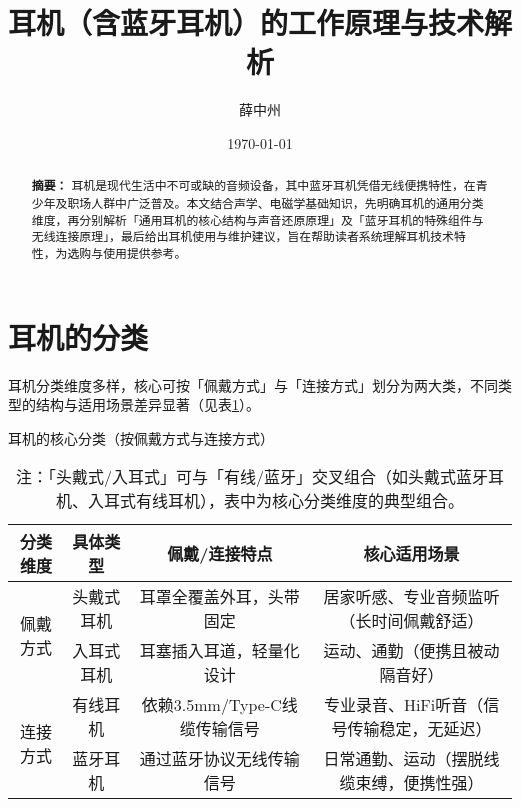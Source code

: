 \documentclass[UTF8]{ctexart}
\title{耳机（含蓝牙耳机）的工作原理与技术解析}
\author{薛中州}
\date{\today}
\begin{document}
\maketitle
\pagestyle{plain}  %

\tableofcontents  %
\listoftables     %
\listoffigures    %
\clearpage        %

\begin{abstract}
\textbf{摘要：} 耳机是现代生活中不可或缺的音频设备，其中蓝牙耳机凭借无线便携特性，在青少年及职场人群中广泛普及。本文结合声学、电磁学基础知识，先明确耳机的通用分类维度，再分别解析「通用耳机的核心结构与声音还原原理」及「蓝牙耳机的特殊组件与无线连接原理」，最后给出耳机使用与维护建议，旨在帮助读者系统理解耳机技术特性，为选购与使用提供参考。
\end{abstract}
\clearpage

\section{耳机的分类}
耳机分类维度多样，核心可按「佩戴方式」与「连接方式」划分为两大类，不同类型的结构与适用场景差异显著（见表\ref{tab:earphone_classification}）。

\begin{table}[htbp]  %
    \centering
    \caption{耳机的核心分类（按佩戴方式与连接方式）}
    \label{tab:earphone_classification}
    \begin{tabular}{c c c c}  %
        \toprule  %
        \textbf{分类维度} & \textbf{具体类型} & \textbf{佩戴/连接特点} & \textbf{核心适用场景} \\
        \midrule  %
        \multirow{2}{*}{佩戴方式} & 头戴式耳机 & 耳罩全覆盖外耳，头带固定 & 居家听感、专业音频监听（长时间佩戴舒适） \\
                                  & 入耳式耳机 & 耳塞插入耳道，轻量化设计 & 运动、通勤（便携且被动隔音好） \\
        \midrule
        \multirow{2}{*}{连接方式} & 有线耳机   & 依赖3.5mm/Type-C线缆传输信号 & 专业录音、HiFi听音（信号传输稳定，无延迟） \\
                                  & 蓝牙耳机   & 通过蓝牙协议无线传输信号   & 日常通勤、运动（摆脱线缆束缚，便携性强） \\
        \bottomrule  %
    \end{tabular}
    \caption*{注：「头戴式/入耳式」可与「有线/蓝牙」交叉组合（如头戴式蓝牙耳机、入耳式有线耳机），表中为核心分类维度的典型组合。}
\end{table}
\end{document}
